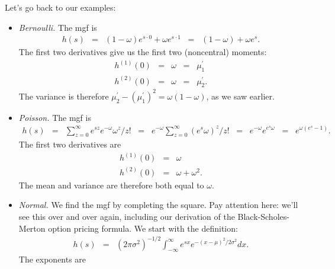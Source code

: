 \documentclass[11pt]{article}
\begin{document}
Let's go back to our examples:
%
\begin{itemize}
\item {\it Bernoulli.\/}
The mgf is
\begin{eqnarray*}
    h(s) &=& (1-\omega) e^{s \cdot 0} + \omega e^{s \cdot 1}
        \;\;=\;\; (1-\omega) + \omega e^{s} .
\end{eqnarray*}
The first two derivatives give us the first two (noncentral) moments:
\begin{eqnarray*}
    h^{(1)}(0) &=& \omega \;\;=\;\; \mu_1^\prime \\
    h^{(2)}(0) &=& \omega \;\;=\;\; \mu_2^\prime.
\end{eqnarray*}
The variance is therefore $\mu_2^\prime - (\mu_1^\prime)^2 = \omega (1-\omega)$, as we saw earlier.

\item {\it Poisson.\/}  The mgf is
\begin{eqnarray*}
    h(s) &=& \sum_{z=0}^\infty e^{sz} e^{-\omega} \omega^z/z!
            \;\;=\;\; e^{-\omega} \sum_{z=0}^\infty \left( e^{s} \omega\right)^z /z!
            \;\;=\;\; e^{-\omega} e^{e^{s} \omega}
            \;\;=\;\; e^{\omega (e^{s}-1)}  .
\end{eqnarray*}
The first two derivatives are
\begin{eqnarray*}
    h^{(1)}(0) &=& \omega  \\
    h^{(2)}(0) &=& \omega + \omega^2 .
\end{eqnarray*}
The mean and variance are therefore both equal to $\omega$.

\item {\it Normal.\/}
We find the mgf by completing the square.
Pay attention here:  we'll see this over and over again, including our derivation
of the Black-Scholes-Merton option pricing formula.
We start with the definition:
\begin{eqnarray*}
        h(s) &=& (2\pi \sigma^2)^{-1/2} \int_{-\infty}^\infty e^{sx} e^{-(x-\mu)^2/2\sigma^2} dx .
\end{eqnarray*}
The exponents are

\smallskip
\newlength{\oldfrule}
\setlength{\oldfrule}{\fboxrule}
\setlength{\fboxrule}{3\fboxrule}
\newlength{\lll}
\setlength{\lll}{\textwidth}
\addtolength{\lll}{-2\fboxsep}
\addtolength{\lll}{-2\fboxrule}
\noindent
{}
\setlength{\fboxrule}{\oldfrule}


\end{itemize}
\end{document}
